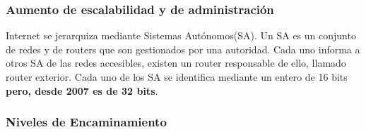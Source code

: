 \documentclass[a4paper,12pt]{article}
\begin{document}
\subsubsection*{Aumento de escalabilidad y de administración}

Internet se jerarquiza mediante Sistemas Autónomos(SA). Un SA es un conjunto de redes y de routers que son gestionados por una autoridad. Cada uno informa a otros SA de las redes accesibles, existen un router responsable de ello, llamado router exterior. Cada uno de los SA se identifica mediante un entero de 16 bits \textbf{pero, desde 2007 es de 32 bits}.


\subsubsection*{Niveles de Encaminamiento}
\end{document}
